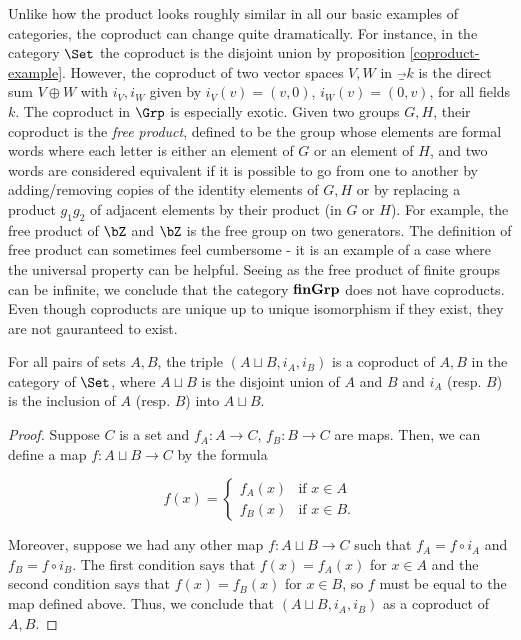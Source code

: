 \begin{rem}\label{coproduct-examples-remark} Unlike how the product looks roughly similar in all our basic examples of categories, the coproduct can change quite dramatically. For instance, in the category $\Set$ the coproduct is the disjoint union by proposition \ref{coproduct-example}. However, the coproduct of two vector spaces $V,W$ in $\Vec_k$ is the direct sum $V\oplus W$ with $i_V,i_W$ given by $i_V(v)=(v,0)$, $i_W(v)=(0,v)$, for all fields $k$. The coproduct in $\Grp$ is especially exotic. Given two groups $G,H$, their coproduct is the {\em free product}, defined to be the group whose elements are formal words where each letter is either an element of $G$ or an element of $H$, and two words are considered equivalent if it is possible to go from one to another by adding/removing copies of the identity elements of $G,H$ or by replacing a product $g_1g_2$ of adjacent elements by their product (in $G$ or $H$). For example, the free product of $\bZ$ and $\bZ$ is the free group on two generators. The definition of free product can sometimes feel cumbersome - it is an example of a case where the universal property can be helpful. Seeing as the free product of finite groups can be infinite, we conclude that the category ${\bf finGrp}$ does not have coproducts. Even though coproducts are unique up to unique isomorphism if they exist, they are not gauranteed to exist.

\end{rem}

\begin{prop}\label{coproduct-example} For all pairs of sets $A,B$, the triple $(A\sqcup B,i_A,i_B)$ is a coproduct of $A,B$ in the category of $\Set$, where $A\sqcup B$ is the disjoint union of $A$ and $B$ and $i_A$ (resp. $B$) is the inclusion of $A$ (resp. $B$) into $A\sqcup B$.
\end{prop}
\begin{proof} Suppose $C$ is a set and $f_A:A\to C$, $f_B:B\to C$ are maps. Then, we can define a map $f:A\sqcup B\to C$ by the formula

$$
f(x)=
\begin{cases}
f_A(x) & \text{if } x\in A\\
f_B(x) & \text{if } x\in B.
\end{cases}
$$

Moreover, suppose we had any other map $f:A\sqcup B\to C$ such that $f_A=f\circ i_A$ and $f_B=f\circ i_B$. The first condition says that $f(x)=f_A(x)$ for $x\in A$ and the second condition says that $f(x)=f_B(x)$ for $x\in B$, so $f$ must be equal to the map defined above. Thus, we conclude that $(A\sqcup B,i_A,i_B)$ as a coproduct of $A,B$.
\end{proof}

